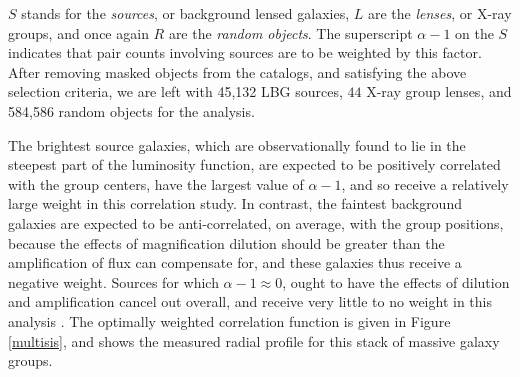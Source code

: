 $S$ stands for the {\it sources}, or background lensed galaxies, $L$ are the {\it lenses}, or X-ray groups, and once again $R$ are the {\it random objects}. The superscript $\alpha-1$ on the $S$ indicates that pair counts involving sources are to be weighted by this factor.  After removing masked objects from the catalogs, and satisfying the above selection criteria, we are left with 45,132 LBG sources, $44$ X-ray group lenses, and 584,586 random objects for the analysis.

\begin{table}
  \begin{center}


   \caption[Luminosity Function Parameters]{Luminosity Function (Schechter) parameters from external LBG measurements. $^a$ LF parameters from \protect \citet{vanderBurg10}. $^b$ LF parameters from \protect \citet{Sawicki06}.}
 \label{LFtable}
  \end{center}
\end{table}


The brightest source galaxies, which are observationally found to lie in the steepest part of the luminosity function, are expected to be positively correlated with the group centers, have the largest value of $\alpha-1$, and so receive a relatively large weight in this correlation study.  In contrast, the faintest background galaxies are expected to be anti-correlated, on average, with the group positions, because the effects of magnification dilution should be greater than the amplification of flux can compensate for, and these galaxies thus receive a negative weight.  Sources for which $\alpha-1 \approx 0$, ought to have the effects of dilution and amplification cancel out overall, and receive very little to no weight in this analysis \citep{Scranton05}. The optimally weighted correlation function is given in Figure \ref{multisis}, and shows the measured radial profile for this stack of massive galaxy groups.


